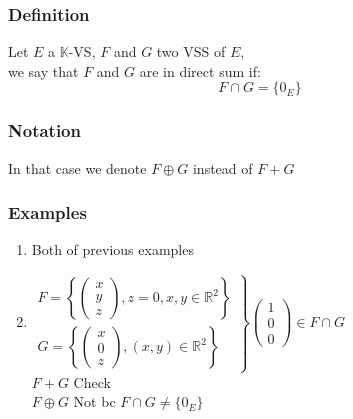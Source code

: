 \documentclass[notitlepage]{math}
\begin{document}
\subsubsection{Definition}
Let $E$ a $\mathbb{K}$-VS, $F$ and $G$ two VSS of $E$,\\ we say that $F$ and $G$ are in direct sum if: 
\[F\cap G = \{0_E\}\]
\subsubsection{Notation}
In that case we denote $F \oplus G$ instead of $ F + G$
\subsubsection{Examples}
\begin{enumerate}
    \item Both of previous examples
    \item $\left. \begin{matrix} 
        F = \left\{ \begin{pmatrix} x \\ y \\ z \end{pmatrix},z = 0, x , y \in \mathbb{R}^2   \right\}\\
        G = \left\{ \begin{pmatrix} x \\ 0 \\ z \end{pmatrix}, (x,y) \in \mathbb{R}^2   \right\}
    \end{matrix} \right\}
    \begin{pmatrix}
        1 \\ 0 \\ 0 
    \end{pmatrix} \in F \cap G    $ \\
    $F+G$  Check\\
    $F \oplus G$  Not bc $F \cap G \ne \{0_E\}$

    

\end{enumerate}
\end{document}
